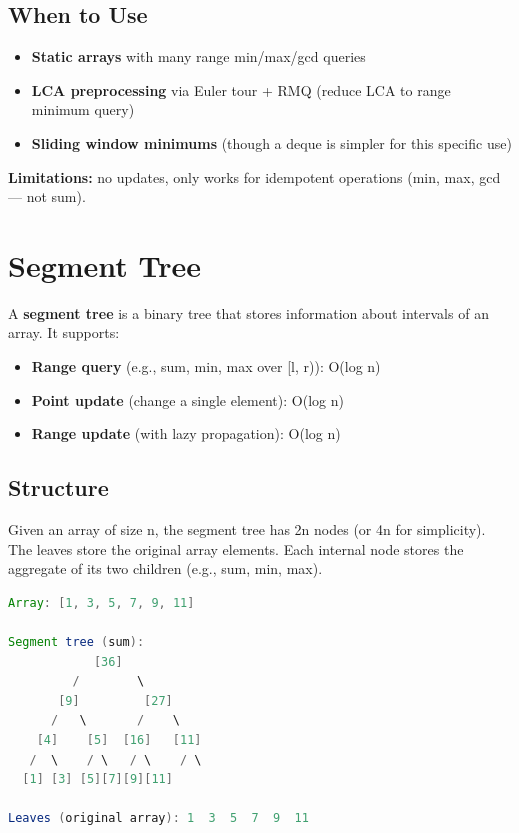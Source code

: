 \subsection{When to Use}

\begin{itemize}
\item \textbf{Static arrays} with many range min/max/gcd queries
\item \textbf{LCA preprocessing} via Euler tour + RMQ (reduce LCA to range minimum query)
\item \textbf{Sliding window minimums} (though a deque is simpler for this specific use)
\end{itemize}

\textbf{Limitations:} no updates, only works for idempotent operations (min, max, gcd — not sum).

\section{Segment Tree}

A \textbf{segment tree} is a binary tree that stores information about intervals of an array. It supports:
\begin{itemize}
\item \textbf{Range query} (e.g., sum, min, max over [l, r)): O(log n)
\item \textbf{Point update} (change a single element): O(log n)
\item \textbf{Range update} (with lazy propagation): O(log n)
\end{itemize}

\subsection{Structure}

Given an array of size n, the segment tree has 2n nodes (or 4n for simplicity). The leaves store the original array elements. Each internal node stores the aggregate of its two children (e.g., sum, min, max).

\begin{lstlisting}[language=Java]
Array: [1, 3, 5, 7, 9, 11]

Segment tree (sum):
            [36]
         /        \
       [9]         [27]
      /   \       /    \
    [4]    [5]  [16]   [11]
   /  \    / \   / \    / \
  [1] [3] [5][7][9][11]

Leaves (original array): 1  3  5  7  9  11
\end{lstlisting}

